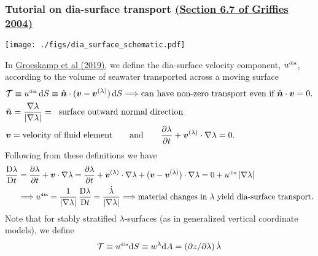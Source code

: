 \documentclass[10pt]{beamer}
\begin{document}
\begin{frame}
  \frametitle{Tutorial on dia-surface transport \href{https://press.princeton.edu/titles/7797.html}{\small (Section 6.7 of Griffies 2004)}}

\vspace{-.2cm} 
\begin{center}
{\texttt{[image: ./figs/dia\_surface\_schematic.pdf]}}
\end{center}

\scriptsize  

In
\href{https://www.annualreviews.org/doi/abs/10.1146/annurev-marine-010318-095421}{Groeskamp
  et al (2019),} we define the dia-surface velocity component,
$u^{\mbox{\tiny dia}}$, according to the volume of seawater
transported across a moving surface
\begin{align}
 &{\cal T} \equiv u^{\mbox{\tiny dia}}  \, \mathrm{d}S  \equiv \hat{\bm n} \cdot ({\bm v} - {\bm v}^{(\lambda)})  \, \mathrm{d}S
 \Longrightarrow  \mbox{can have non-zero transport even if $\hat{\bm n} \cdot {\bm v} =0$.}
  \\
&\hat{\bm n} = \frac{\nabla \lambda}{|\nabla \lambda|}    = \; \; \mbox{surface outward normal direction} 
 \\
&{\bm v}  = \mbox{velocity of fluid element}   \qquad \mbox{and} \qquad 
   \frac{\partial \lambda}{\partial t} +   {\bm v}^{(\lambda)} \cdot \nabla \lambda = 0.
\end{align}
 Following from these definitions we have 
\begin{align}
  \frac{\mathrm{D}\lambda}{\mathrm{D}t} 
  &= \frac{\partial \lambda}{\partial t} + {\bm v} \cdot \nabla \lambda 
 = \frac{\partial \lambda}{\partial t} + {\bm v}^{(\lambda)} \cdot \nabla \lambda  + ({\bm v} - {\bm v}^{(\lambda)}) \cdot \nabla \lambda 
= 0 + u^{\mbox{\tiny dia}} \, |\nabla \lambda| 
\\
 &\Longrightarrow u^{\mbox{\tiny dia}}  = \frac{1}{|\nabla \lambda|} \, \frac{\mathrm{D}\lambda}{\mathrm{D}t}  = \frac{\dot{\lambda}}{|\nabla \lambda|}
\Longrightarrow \mbox{material changes in $\lambda$ yield dia-surface transport.}
\end{align}
Note that for stably stratified $\lambda$-surfaces (as in generalized
vertical coordinate models), we define
\begin{equation}
   {\cal T} \equiv u^{\mbox{\tiny dia}}  \mathrm{d}S  
  \equiv  w^{\lambda}  \mathrm{d}A = (\partial z/ \partial \lambda) \, \dot{\lambda} 
\end{equation}


\end{frame}
\end{document}
